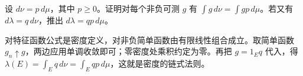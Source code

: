 \begin{exercise}
设 $d\nu=p\,d\mu$，其中 $p\ge0$。证明对每个非负可测 $g$ 有 $\int g\,d\nu=\int gp\,d\mu$。若又有 $d\lambda=q\,d\nu$，推出 $d\lambda=qp\,d\mu$。
\end{exercise}
\begin{solution}
对特征函数公式是密度定义，对非负简单函数由有限线性组合成立。取简单函数 $g_n\uparrow g$，两边应用单调收敛即可；零密度处乘积约定为零。再把 $g=1_Eq$ 代入，得 $\lambda(E)=\int_Eq\,d\nu=\int_Eqp\,d\mu$，这就是密度的链式法则。
\end{solution}

